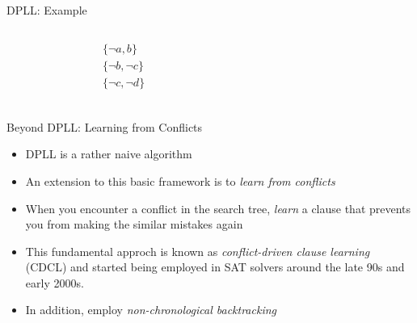 \documentclass{beamer}
\begin{document}
\begin{frame}{DPLL: Example}
    \begin{columns}
        \begin{column}{0.45\textwidth}
            \begin{align*}
                &\{\neg a,b\}\\
                &\{\neg b,\neg c\}\\
                &\{\neg c,\neg d\}\\
            \end{align*}
        \end{column}

        \begin{column}{0.45\textwidth}
        \end{column}
    \end{columns}
\end{frame}

\begin{frame}{Beyond DPLL: Learning from Conflicts}
    \begin{itemize}
        \item DPLL is a rather naive algorithm
        \item An extension to this basic framework is to \textit{learn from conflicts} 
        \item When you encounter a conflict in the search tree, \textit{learn} a clause that prevents you from making the similar mistakes again
        \item This fundamental approch is known as \textit{conflict-driven clause learning} (CDCL) and started being employed in SAT solvers around the late 90s and early 2000s.
        \item In addition, employ \textit{non-chronological backtracking}
    \end{itemize}
\end{frame}
\end{document}

